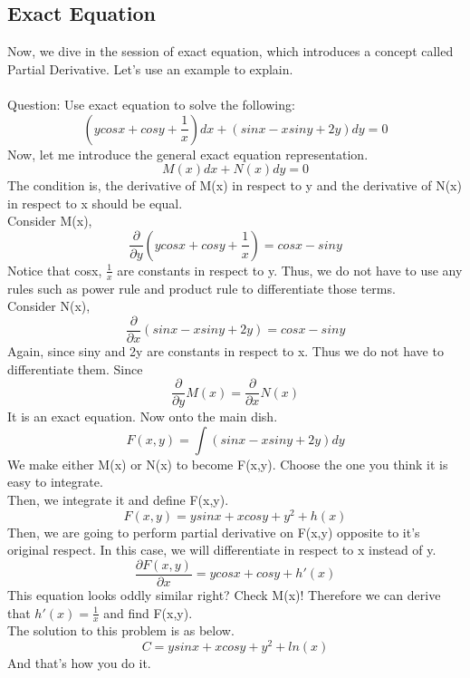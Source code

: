 \documentclass{article}
\begin{document}
\subsection{Exact Equation}
Now, we dive in the session of exact equation, which introduces a concept called Partial Derivative. Let's use an example to explain.
\\
\\
Question: Use exact equation to solve the following:
\begin{equation*}
	(ycosx+cosy+\frac{1}{x})dx + (sinx-xsiny+2y)dy = 0
\end{equation*}
Now, let me introduce the general exact equation representation.
\begin{equation*}
	M(x)dx + N(x)dy = 0
\end{equation*}
The condition is, the derivative of M(x) in respect to y and the derivative of N(x) in respect to x should be equal. \\
Consider M(x), 
\begin{equation*}
	\frac{\partial}{\partial y} (ycosx+cosy+\frac{1}{x}) = cosx-siny
\end{equation*}
Notice that cosx, $\frac{1}{x}$ are constants in respect to y. Thus, we do not have to use
any rules such as power rule and product rule to differentiate those terms.
\\Consider N(x),
\begin{equation*}
	\frac{\partial}{\partial x} (sinx-xsiny+2y) = cosx-siny
\end{equation*}
Again, since siny and 2y are constants in respect to x. Thus we do not have to differentiate them.
Since 
\begin{equation*}
	\frac{\partial}{\partial y}M(x) = \frac{\partial}{\partial x} N(x)
\end{equation*}
It is an exact equation. Now onto the main dish.
\begin{equation*}
	F(x,y) = \int(sinx-xsiny+2y)dy
\end{equation*}
We make either M(x) or N(x) to become F(x,y). Choose the one you think it is easy to integrate.\\
Then, we integrate it and define F(x,y).
\begin{equation*}
	F(x,y) = ysinx+xcosy+y^2+h(x)
\end{equation*}
Then, we are going to perform partial derivative on F(x,y) opposite to it's original respect. In this case, we will differentiate in respect to x instead of y.
\begin{equation*}
	\frac{\partial F(x,y)}{\partial x} = ycosx+cosy+h'(x)
\end{equation*}
This equation looks oddly similar right? Check M(x)! Therefore we can derive that $h'(x) = \frac{1}{x}$ and find F(x,y).\\
The solution to this problem is as below.
\begin{equation*}
	C = ysinx+xcosy+y^2+ln(x)
\end{equation*}
And that's how you do it.
\end{document}
